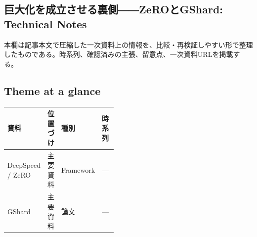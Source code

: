 \subsection*{巨大化を成立させる裏側――ZeROとGShard: Technical Notes}
本欄は記事本文で圧縮した一次資料上の情報を、比較・再検証しやすい形で整理したものである。時系列、確認済みの主張、留意点、一次資料URLを掲載する。
\smallskip
{}\par
\medskip
\subsection*{Theme at a glance}
\begin{center}
\footnotesize
\begin{tabularx}{\linewidth}{@{}p{0.20\linewidth}p{0.10\linewidth}p{0.14\linewidth}X@{}}
\toprule
資料 & 位置づけ & 種別 & 時系列 \\
\midrule
DeepSpeed / ZeRO & 主要資料 & Framework & — \\
GShard & 主要資料 & 論文 & — \\
\bottomrule
\end{tabularx}
\end{center}
\normalsize

